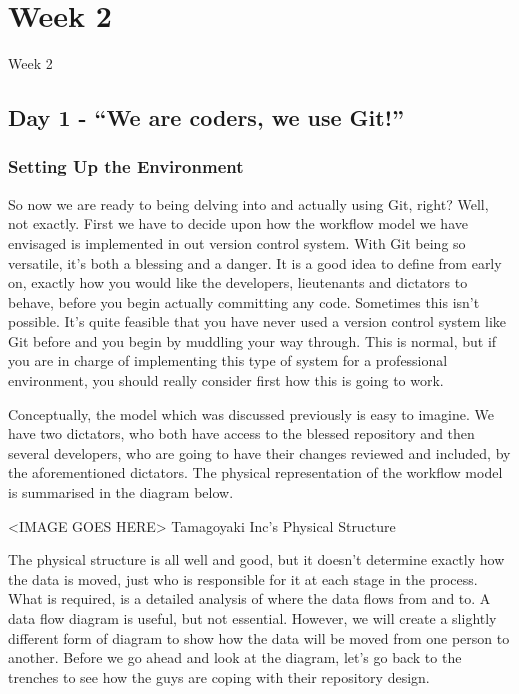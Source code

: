 \cleardoublepage
{}
\chapter*{Week 2}Week 2
\section*{Day 1 - ``We are coders, we use Git!''}
\subsection*{Setting Up the Environment}

So now we are ready to being delving into and actually using Git, right?  Well, not exactly.  First we have to decide upon how the workflow model we have envisaged is implemented in out version control system.  With Git being so versatile, it's both a blessing and a danger.  It is a good idea to define from early on, exactly how you would like the developers, lieutenants and dictators to behave, before you begin actually committing any code.  Sometimes this isn't possible.  It's quite feasible that you have never used a version control system like Git before and you begin by muddling your way through.  This is normal, but if you are in charge of implementing this type of system for a professional environment, you should really consider first how this is going to work. 

Conceptually, the model which was discussed previously is easy to imagine.  We have two dictators, who both have access to the blessed repository and then several developers, who are going to have their changes reviewed and included, by the aforementioned dictators.  The physical representation of the workflow model is summarised in the diagram below.

<IMAGE GOES HERE>
Tamagoyaki Inc's Physical Structure

The physical structure is all well and good, but it doesn't determine exactly how the data is moved, just who is responsible for it at each stage in the process.  What is required, is a detailed analysis of where the data flows from and to.  A data flow diagram is useful, but not essential.  However, we will create a slightly different form of diagram to show how the data will be moved from one person to another.  Before we go ahead and look at the diagram, let's go back to the trenches to see how the guys are coping with their repository design. 

